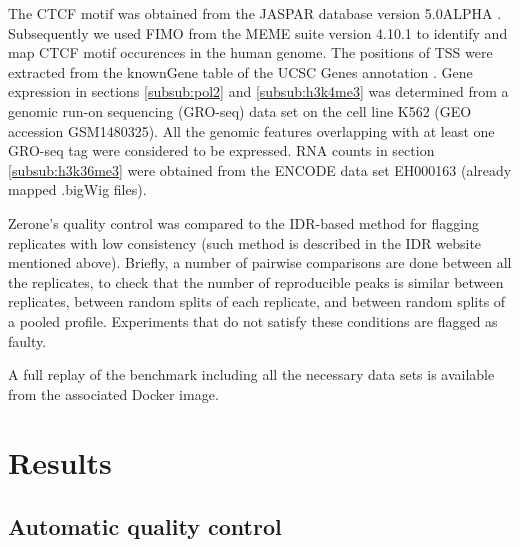 \documentclass{bioinfo}
\begin{document}
\begin{methods}
The CTCF motif was obtained from the JASPAR database version
5.0{\textunderscore}ALPHA \citep[motif ID MA0139.1,][]{pmid24194598}.
Subsequently we used FIMO \citep{pmid21330290} from the MEME suite version
4.10.1 \citep{pmid19458158} to identify and map CTCF motif occurences in
the human genome. The positions of TSS were extracted from the knownGene
table of the UCSC Genes annotation \citep{Karolchik2004}.
Gene expression in sections \ref{subsub:pol2} and \ref{subsub:h3k4me3}
was determined from a genomic run-on sequencing (GRO-seq)
data set on the cell line K562 (GEO accession GSM1480325).
All the genomic features overlapping with at least one GRO-seq tag
were considered to be expressed.
RNA counts in section \ref{subsub:h3k36me3} were obtained from the
ENCODE data set EH000163 (already mapped .bigWig files).

Zerone's quality control was compared to the IDR-based method
for flagging replicates with low consistency
(such method is described in the IDR website mentioned above).
Briefly, a number of pairwise comparisons are done between all the replicates,
to check that the number of reproducible peaks is similar between replicates,
between random splits of each replicate, and between random splits of a pooled
profile. Experiments that do not satisfy these conditions are flagged as faulty.

A full replay of the benchmark including all the necessary data sets
is available from the associated Docker image.

\end{methods}

\section{Results}
\label{sec:results}

\subsection{Automatic quality control}
\end{document}
